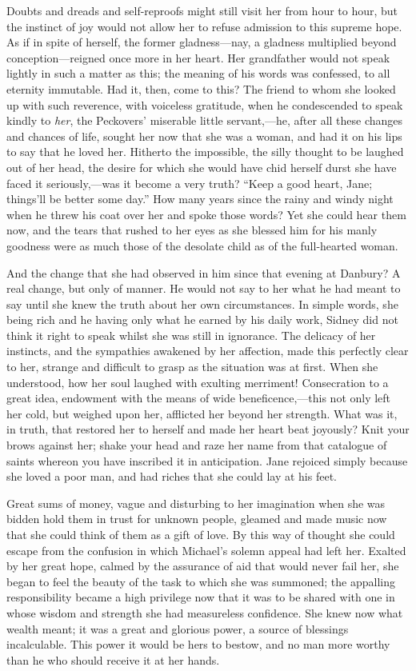 Doubts and dreads and self-reproofs might still visit her from hour to
hour, but the instinct of joy would not allow her to refuse admission to
this supreme hope. As if in spite of herself, the former gladness---nay,
a gladness multiplied beyond conception---reigned once more in her
heart. Her grandfather would not speak lightly in such a matter as this;
the meaning of his words was confessed, to all eternity immutable. Had
it, then, come to this? The friend to whom she looked up with such
reverence, with voiceless gratitude, when he condescended to speak
kindly to \emph{her}, the Peckovers' miserable little servant,---he,
after all these changes and chances of life, sought her now that she was
a woman, and had it on his lips to say that he loved her. Hitherto the
impossible, the silly thought to be laughed out of her head, the desire
for which she would have chid herself durst she {}have faced it
seriously,---was it become a very truth? ``Keep a good heart, Jane;
things'll be better some day.'' How many years since the rainy and windy
night when he threw his coat over her and spoke those words? Yet she
could hear them now, and the tears that rushed to her eyes as she
blessed him for his manly goodness were as much those of the desolate
child as of the full-hearted woman.

And the change that she had observed in him since that evening at
Danbury? A real change, but only of manner. He would not say to her what
he had meant to say until she knew the truth about her own
circumstances. In simple words, she being rich and he having only what
he earned by his daily work, Sidney did not think it right to speak
whilst she was still in ignorance. The delicacy of her instincts, and
the sympathies awakened by her affection, made this perfectly clear to
her, strange and difficult to grasp as the situation was at first. When
she understood, how her soul laughed with exulting merriment!
Consecration to a great {}idea, endowment with the means of wide
beneficence,---this not only left her cold, but weighed upon her,
afflicted her beyond her strength. What was it, in truth, that restored
her to herself and made her heart beat joyously? Knit your brows against
her; shake your head and raze her name from that catalogue of saints
whereon you have inscribed it in anticipation. Jane rejoiced simply
because she loved a poor man, and had riches that she could lay at his
feet.

Great sums of money, vague and disturbing to her imagination when she
was bidden hold them in trust for unknown people, gleamed and made music
now that she could think of them as a gift of love. By this way of
thought she could escape from the confusion in which Michael's solemn
appeal had left her. Exalted by her great hope, calmed by the assurance
of aid that would never fail her, she began to feel the beauty of the
task to which she was summoned; the appalling responsibility became a
high privilege now that it was to be shared with one in whose {}wisdom
and strength she had measureless confidence. She knew now what wealth
meant; it was a great and glorious power, a source of blessings
incalculable. This power it would be hers to bestow, and no man more
worthy than he who should receive it at her hands.

